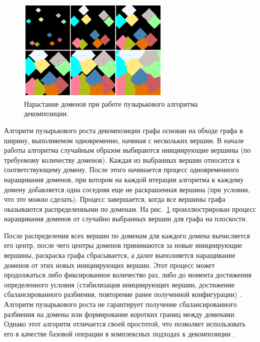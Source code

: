 \documentclass[
11pt,%
tightenlines,%
twoside,%
onecolumn,%
nofloats,%
nobibnotes,%
nofootinbib,%
superscriptaddress,%
noshowpacs,%
centertags]%
{revtex4}
\begin{document}
\begin{figure}[h]
\setcaptionmargin{5mm}
\onelinecaptionstrue  %
\includegraphics[width=0.65\textwidth]{pics/incr.pdf}
\caption{Нарастание доменов при работе пузырькового алгоритма декомпозиции.}\label{fig:incr}
\end{figure}

Алгоритм пузырькового роста декомпозиции графа \cite{17Fan} основан на обходе графа в ширину, выполняемом одновременно, начиная с нескольких вершин.
В начале работы алгоритма случайным образом выбираются инициирующие вершины (по требуемому количеству доменов).
Каждая из выбранных вершин относится к соответствующему домену.
После этого начинается процесс одновременного наращивания доменов, при котором на каждой итерации алгоритма к каждому домену добавляется одна соседняя еще не раскрашенная вершина (при условии, что это можно сделать).
Процесс завершается, когда все вершины графа оказываются распределенными по доменам.
На рис.~\ref{fig:incr} проиллюстрирован процесс наращивания доменов от случайно выбранных вершин для графа на плоскости.

После распределения всех вершин по доменам для каждого домена вычисляется его центр, после чего центры доменов принимаются за новые инициирующие вершины, раскраска графа сбрасывается, а далее выполняется наращивание доменов от этих новых инициирующих вершин.
Этот процесс может продолжаться либо фиксированное количество раз, либо до момента достижения определенного условия (стабилизация инициирующих вершин, достижение сбалансированного разбиения, повторение ранее полученной конфигурации) \cite{18Golovchenko}.
Алгоритм пузырькового роста не гарантирует получение сбалансированного разбиения на домены или формирование коротких границ между доменами.
Однако этот алгоритм отличается своей простотой, что позволяет использовать его в качестве базовой операции в комплексных подходах к декомпозиции \cite{19Wu}.
\end{document}
